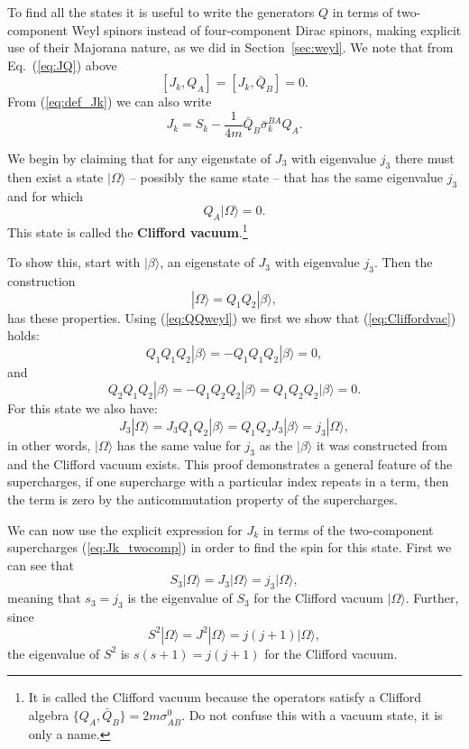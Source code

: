 \documentclass[notes.tex]{subfiles}
\begin{document}
To find all the states it is useful to write the generators $Q$ in terms of two-component Weyl spinors instead of four-component Dirac spinors, making explicit use of their Majorana nature, as we did in Section~\ref{sec:weyl}. We note that from Eq.~(\ref{eq:JQ}) above 
\[[J_k, Q_A] = [J_k, \bar{Q}_{\dot{B}}] = 0.\]
From (\ref{eq:def_Jk}) we can also write
\begin{equation}
J_k = S_k - \frac{1}{4m}\bar{Q}_{\dot{B}}\bar{\sigma}_k^{\dot{B}A}Q_A.
\label{eq:Jk_twocomp}
\end{equation}



We begin by claiming that for any eigenstate of $J_3$ with eigenvalue $j_3$ there must then exist a state $|\Omega\rangle$ -- possibly the same state -- that has the same eigenvalue $j_3$ and for which
\begin{equation}
Q_A|\Omega\rangle = 0.\label{eq:Cliffordvac}
\end{equation}
This state is called the {\bf Clifford vacuum}.\footnote{It is called the Clifford vacuum because the operators satisfy a Clifford algebra $\{Q_A, \bar{Q}_{\dot{B}}\} = 2m\sigma^0_{A\dot{B}}$. Do not confuse this with a vacuum state, it is only a name.} 

To show this, start with $|\beta\rangle$, an eigenstate of $J_3$ with eigenvalue $j_3$. Then the construction
\[ |\Omega\rangle=Q_1Q_2|\beta\rangle,\]
has these properties. Using (\ref{eq:QQweyl}) we first we show that (\ref{eq:Cliffordvac}) holds:
\[Q_1Q_1Q_2|\beta\rangle = -Q_1Q_1Q_2|\beta \rangle = 0,\]
and
\[Q_2Q_1Q_2|\beta\rangle = -Q_1Q_2Q_2|\beta\rangle = Q_1Q_2Q_2|\beta\rangle= 0.\]
For this state we also  have:
\begin{equation*}
J_3 |\Omega\rangle = J_3Q_1Q_2|\beta\rangle =Q_1Q_2J_3|\beta\rangle = j_3|\Omega\rangle,
\end{equation*}
in other words, $|\Omega\rangle$ has the same value for $j_3$ as the $|\beta\rangle$ it was constructed from and  the Clifford vacuum exists. This proof demonstrates a general feature of the supercharges, if one supercharge with a particular index repeats in a term, then the term is zero by the anticommutation property of the supercharges.

We can now use the explicit expression  for $J_k$ in terms of the two-component supercharges (\ref{eq:Jk_twocomp}) in order to find the spin for this state. First we can see that
\[S_3|\Omega\rangle = J_3|\Omega\rangle =j_3|\Omega\rangle,\]
meaning that $s_3 = j_3$ is the eigenvalue of $S_3$ for the Clifford vacuum $|\Omega\rangle$. Further, since 
\[S^2|\Omega\rangle = J^2|\Omega\rangle =j(j+1)|\Omega\rangle,\]
the eigenvalue of $S^2$ is $s(s+1)=j(j+1)$ for the Clifford vacuum.
\end{document}
